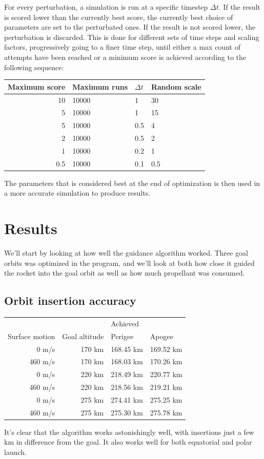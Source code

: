 \documentclass[11pt]{article}
\begin{document}
For every perturbation, a simulation is run at a specific timestep $\Delta t$. If the result is scored lower than the currently best score, the currently best choice of parameters are set to
the perturbated ones.
If the result is not scored lower, the perturbation is discarded.
This is done for different sets of time steps and scaling factors, progressively going to a finer time step, until either a max count of attempts have been reached or a minimum score is achieved according to the following sequence:
\begin{center}
  \begin{tabular}{ r | l | l | l  }
    Maximum score & Maximum runs & $\Delta t$ & Random scale \\
    \hline
    10 & 10000 & 1 & 30 \\
    5 & 10000 & 1 & 15 \\
    5 & 10000 & 0.5 & 4 \\
    2 & 10000 & 0.5 & 2 \\
    1 & 10000 & 0.2 & 1 \\
    0.5 & 10000 & 0.1 & 0.5 \\
  \end{tabular}
\end{center}

The parameters that is considered best at the end of optimization is then used in a more accurate simulation to produce results.

\section{Results}
We'll start by looking at how well the guidance algorithm worked. Three goal orbits was optimized in the program, and we'll look at both how close it guided the rocket into the goal orbit as well as how much propellant was consumed.
\subsection{Orbit insertion accuracy}
\begin{center}
  \begin{tabular}{ r | r  | l  l  }
     &   &  Achieved  \\
    Surface motion & Goal altitude & Perigee & Apogee \\
    \hline
    0 m/s & 170 km & 168.45 km & 169.52 km \\
    460 m/s & 170 km & 168.03 km & 170.26 km \\
    \hline
    0 m/s & 220 km & 218.49 km & 220.77 km \\
    460 m/s & 220 km  & 218.56 km & 219.21 km \\
    \hline
    0 m/s & 275 km & 274.41 km & 275.25 km \\
    460 m/s & 275 km & 275.30 km & 275.78 km
  \end{tabular}
\end{center}
It's clear that the algorithm works astonishingly well, with insertions just a few km in difference from the goal. It also works well for both equatorial and polar launch.
\end{document}
